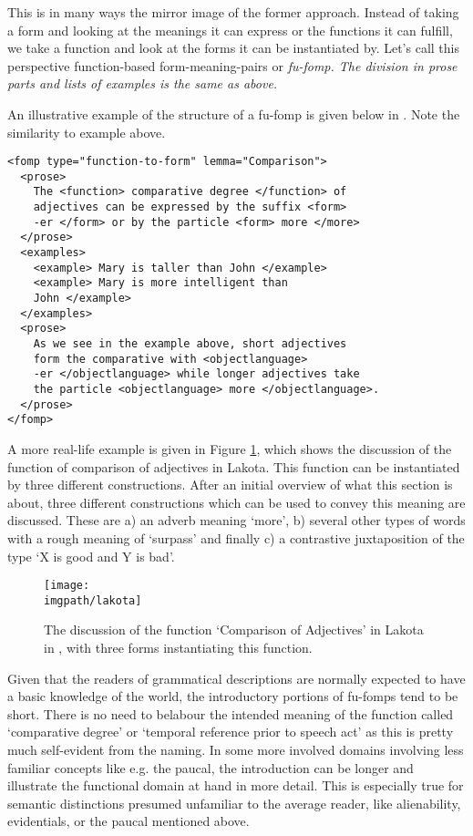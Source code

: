 This is in many ways the mirror image of the former approach. Instead of taking a form and looking at the meanings it can express or the functions it can fulfill, we take a function and look at the forms it can be instantiated by. Let's call this perspective function-based form-meaning-pairs or \em fu-fomp\em. The division in prose parts and lists of examples is the same as above.

An illustrative example of the structure of a fu-fomp is given below in . Note the similarity to example  above.

\ea\label{xml:fufomp:intro}
\begin{verbatim}
<fomp type="function-to-form" lemma="Comparison">
  <prose>
    The <function> comparative degree </function> of
    adjectives can be expressed by the suffix <form>
    -er </form> or by the particle <form> more </more>
  </prose>
  <examples>
    <example> Mary is taller than John </example>
    <example> Mary is more intelligent than
    John </example>
  </examples>
  <prose>
    As we see in the example above, short adjectives
    form the comparative with <objectlanguage>
    -er </objectlanguage> while longer adjectives take
    the particle <objectlanguage> more </objectlanguage>.
  </prose>
</fomp>
\end{verbatim}
\z




A more real-life example is given in Figure \ref{fig:lakota}, which shows the discussion of the function of comparison of adjectives in Lakota. This function can be instantiated by three different constructions. After an initial overview of what this section is about, three different constructions which can be used to convey this meaning are discussed. These are a) an adverb meaning `more', b) several other types of words with a rough meaning of `surpass' and finally c) a contrastive juxtaposition of the type `X is good and Y is bad'.

\begin{figure}
\texttt{[image: \\imgpath/lakota]}
\caption{The discussion of the function `Comparison of Adjectives' in Lakota in \citet{Buechel1939}, with three forms instantiating this function.}
\label{fig:lakota}
\end{figure}

Given that the readers of grammatical descriptions are normally expected to have a basic knowledge of the world, the introductory portions of fu-fomps tend to be short. There is no need to belabour the intended meaning of the function called `comparative degree' or `temporal reference prior to speech act' as this is pretty much self-evident from the naming. In some more involved domains involving less familiar concepts like e.g. the paucal, the introduction can be longer and illustrate the functional domain at hand in more detail. This is especially true for semantic distinctions presumed unfamiliar to the average reader, like alienability, evidentials, or the paucal mentioned above.

